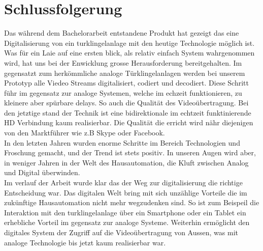 \section{Schlussfolgerung}
\label{sec:schlussfolgerung}
Das während dem Bachelorarbeit entstandene Produkt hat gezeigt das eine Digitalisierung von ein \gls{turklingelanlage} mit den heutige Technologie möglich ist. Was für ein Laie auf eine ersten blick, als relativ einfach System wahrgenommen wird, hat uns bei der Enwicklung grosse Herausforderung bereitgehalten. Im gegensatzt zum herkömmliche analoge Türklingelanlagen werden bei unserem Prototyp alle Viedeo Streams digitalisiert, codiert und decodiert. Diese Schritt führ im gegensatz zur analoge Systemen, welche im echzeit funktionieren, zu kleinere aber spürbare delays. So auch die Qualität des Videoübertragung. Bei den jetztige stand der Technik ist eine bidirektionale im echtzeit funktinierende HD Verbindung kaum realisierbar. Die Qualität die erricht wird nähr diejenigen von den Marktführer wie z.B Skype oder Facebook.\\
In den letzten Jahren wurden enorme Schritte im Bereich Technologien und Froschung gemacht, und der Trend ist stets positiv. In unseren Augen wird aber, in weniger Jahren in der Welt des Hausautomation, die Kluft zwischen Analog und Digital überwinden.\\
Im verlauf der Arbeit wurde klar das der Weg zur digitalisierung die richtige Entscheidung war. Das digitalen Welt bring mit sich unzählige Vorteile die im zukünftige Hausautomation nicht mehr wegzudenken sind. So ist zum Beispeil die Interaktion mit den \gls{turklingelanlage} über ein Smartphone oder ein Tablet ein erhebliche Vorteil im gegensatz zur analoge Systeme. Weiterhin ermöglicht den digitales System der Zugriff auf die Videoübertragung von Aussen, was mit analoge Technologie bis jetzt kaum realisierbar war.\\
   

    



  
